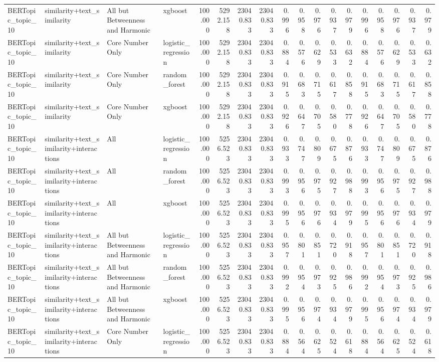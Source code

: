 \begin{tabular}{llllrrrrrrrrrrrrrr}
BERTopic_topic_10 & similarity+text_similarity & All but Betweenness and Harmonic & xgboost & 100.000 & 5292.158 & 23040.833 & 23040.833 & 0.996 & 0.958 & 0.976 & 0.937 & 0.979 & 0.996 & 0.958 & 0.976 & 0.937 & 0.979 \\
BERTopic_topic_10 & similarity+text_similarity & Core Number Only & logistic_regression & 100.000 & 5292.158 & 23040.833 & 23040.833 & 0.884 & 0.576 & 0.629 & 0.533 & 0.632 & 0.884 & 0.576 & 0.629 & 0.533 & 0.632 \\
BERTopic_topic_10 & similarity+text_similarity & Core Number Only & random_forest & 100.000 & 5292.158 & 23040.833 & 23040.833 & 0.915 & 0.683 & 0.715 & 0.617 & 0.858 & 0.915 & 0.683 & 0.715 & 0.617 & 0.858 \\
BERTopic_topic_10 & similarity+text_similarity & Core Number Only & xgboost & 100.000 & 5292.158 & 23040.833 & 23040.833 & 0.926 & 0.647 & 0.705 & 0.580 & 0.778 & 0.926 & 0.647 & 0.705 & 0.580 & 0.778 \\
BERTopic_topic_10 & similarity+text_similarity+interactions & All & logistic_regression & 100.000 & 5256.523 & 23040.833 & 23040.833 & 0.933 & 0.747 & 0.809 & 0.675 & 0.876 & 0.933 & 0.747 & 0.809 & 0.675 & 0.876 \\
BERTopic_topic_10 & similarity+text_similarity+interactions & All & random_forest & 100.000 & 5256.523 & 23040.833 & 23040.833 & 0.993 & 0.956 & 0.975 & 0.927 & 0.988 & 0.993 & 0.956 & 0.975 & 0.927 & 0.988 \\
BERTopic_topic_10 & similarity+text_similarity+interactions & All & xgboost & 100.000 & 5256.523 & 23040.833 & 23040.833 & 0.995 & 0.956 & 0.976 & 0.934 & 0.979 & 0.995 & 0.956 & 0.976 & 0.934 & 0.979 \\
BERTopic_topic_10 & similarity+text_similarity+interactions & All but Betweenness and Harmonic & logistic_regression & 100.000 & 5256.523 & 23040.833 & 23040.833 & 0.957 & 0.801 & 0.851 & 0.720 & 0.918 & 0.957 & 0.801 & 0.851 & 0.720 & 0.918 \\
BERTopic_topic_10 & similarity+text_similarity+interactions & All but Betweenness and Harmonic & random_forest & 100.000 & 5256.523 & 23040.833 & 23040.833 & 0.992 & 0.954 & 0.973 & 0.925 & 0.986 & 0.992 & 0.954 & 0.973 & 0.925 & 0.986 \\
BERTopic_topic_10 & similarity+text_similarity+interactions & All but Betweenness and Harmonic & xgboost & 100.000 & 5256.523 & 23040.833 & 23040.833 & 0.995 & 0.956 & 0.974 & 0.934 & 0.979 & 0.995 & 0.956 & 0.974 & 0.934 & 0.979 \\
BERTopic_topic_10 & similarity+text_similarity+interactions & Core Number Only & logistic_regression & 100.000 & 5256.523 & 23040.833 & 23040.833 & 0.884 & 0.564 & 0.625 & 0.524 & 0.618 & 0.884 & 0.564 & 0.625 & 0.524 & 0.618 \\

\end{tabular}
